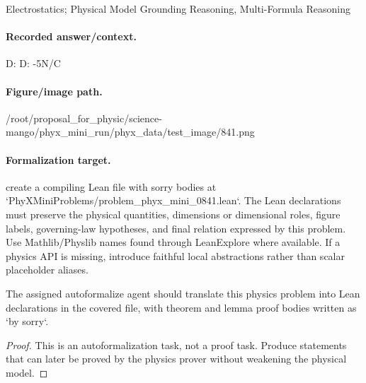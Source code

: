 Electrostatics; Physical Model Grounding Reasoning, Multi-Formula Reasoning

\paragraph{Recorded answer/context.}
D: D: -5N/C

\paragraph{Figure/image path.}
/root/proposal\_for\_physic/science-mango/phyx\_mini\_run/phyx\_data/test\_image/841.png

\paragraph{Formalization target.}
create a compiling Lean file with sorry bodies at `PhyXMiniProblems/problem\_phyx\_mini\_0841.lean`. The Lean declarations must preserve the physical quantities, dimensions or dimensional roles, figure labels, governing-law hypotheses, and final relation expressed by this problem.
Use Mathlib/Physlib names found through LeanExplore where available. If a physics API is missing, introduce faithful local abstractions rather than scalar placeholder aliases.

\begin{theorem}
\label{thm:physics:phyx_mini_0841:target}
The assigned autoformalize agent should translate this physics problem into Lean declarations in the covered file, with theorem and lemma proof bodies written as `by sorry`.
\end{theorem}
\begin{proof}
This is an autoformalization task, not a proof task. Produce statements that can later be proved by the physics prover without weakening the physical model.
\end{proof}

